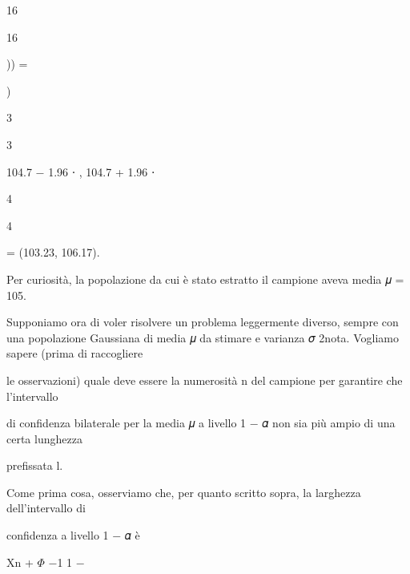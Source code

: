 \documentclass[a4paper,portrait,12pt]{article}
\begin{document}
16


16





)) =


)





3


3


104.7 $-$ 1.96 ⋅ , 104.7 + 1.96 ⋅


4


4





= (103.23, 106.17).


\begin{flushleft}
Per curiosit\`{a}, la popolazione da cui \`{e} stato estratto il campione aveva media 𝜇 = 105.
\end{flushleft}


\begin{flushleft}
Supponiamo ora di voler risolvere un problema leggermente diverso, sempre con una popolazione Gaussiana di media 𝜇 da stimare e varianza 𝜎 2nota. Vogliamo sapere (prima di raccogliere
\end{flushleft}


\begin{flushleft}
le osservazioni) quale deve essere la numerosit\`{a} n del campione per garantire che l'intervallo
\end{flushleft}


\begin{flushleft}
di confidenza bilaterale per la media 𝜇 a livello 1 $-$ 𝛼 non sia più ampio di una certa lunghezza
\end{flushleft}


\begin{flushleft}
prefissata l.
\end{flushleft}


\begin{flushleft}
Come prima cosa, osserviamo che, per quanto scritto sopra, la larghezza dell'intervallo di
\end{flushleft}


\begin{flushleft}
confidenza a livello 1 $-$ 𝛼 \`{e}
\end{flushleft}


\begin{flushleft}
Xn + $\Phi$ $-$1 1 $-$
\end{flushleft}
\end{document}
